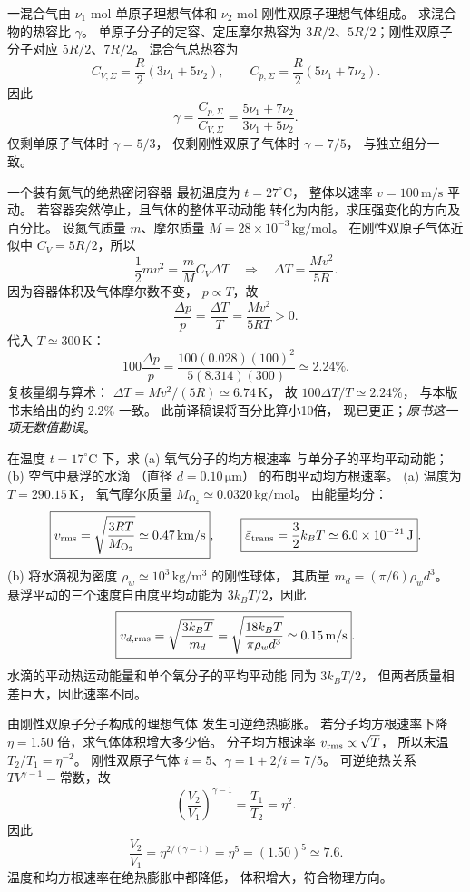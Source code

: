 一混合气由 $\nu_1$ mol 单原子理想气体和
$\nu_2$ mol 刚性双原子理想气体组成。
求混合物的热容比 $\gamma$。
\exsolution
单原子分子的定容、定压摩尔热容为
$3R/2$、$5R/2$；刚性双原子分子对应
$5R/2$、$7R/2$。
混合气总热容为
\[
C_{V,\Sigma}=\frac R2(3\nu_1+5\nu_2),\qquad
C_{p,\Sigma}=\frac R2(5\nu_1+7\nu_2).
\]
因此
\[
\boxed{\gamma=
\frac{C_{p,\Sigma}}{C_{V,\Sigma}}
=\frac{5\nu_1+7\nu_2}{3\nu_1+5\nu_2}}.
\]
\excheck 仅剩单原子气体时 $\gamma=5/3$，
仅剩刚性双原子气体时 $\gamma=7/5$，
与独立组分一致。

一个装有氮气的绝热密闭容器
最初温度为 $t=27^\circ\mathrm C$，
整体以速率 $v=100\,\mathrm{m/s}$ 平动。
若容器突然停止，且气体的整体平动动能
转化为内能，求压强变化的方向及百分比。
\exsolution
设氮气质量 $m$、摩尔质量
$M=28\times10^{-3}\,\mathrm{kg/mol}$。
在刚性双原子气体近似中
$C_V=5R/2$，所以
\[
\frac12mv^2=\frac mM C_V\Delta T
\quad\Longrightarrow\quad
\Delta T=\frac{Mv^2}{5R}.
\]
因为容器体积及气体摩尔数不变，
$p\propto T$，故
\[
\boxed{\frac{\Delta p}{p}
=\frac{\Delta T}{T}
=\frac{Mv^2}{5RT}>0}.
\]
代入 $T\simeq300\,\mathrm K$：
\[
\boxed{100\frac{\Delta p}{p}
=\frac{100(0.028)(100)^2}{5(8.314)(300)}
\simeq2.24\%}.
\]
\excheck 复核量纲与算术：
$\Delta T=Mv^2/(5R)\simeq6.74\,\mathrm K$，
故 $100\Delta T/T\simeq2.24\%$，
与本版书末给出的约 $2.2\%$ 一致。
此前译稿误将百分比算小10倍，
现已更正；\emph{原书这一项无数值勘误}。

在温度 $t=17^\circ\mathrm C$ 下，求
(a) 氧气分子的均方根速率
与单分子的平均平动动能；
(b) 空气中悬浮的水滴
（直径 $d=0.10\,\mathrm{\mu m}$）
的布朗平动均方根速率。
\exsolution
(a) 温度为 $T=290.15\,\mathrm K$，
氧气摩尔质量
$M_{\mathrm O_2}\simeq0.0320\,\mathrm{kg/mol}$。
由能量均分：
\[
\boxed{v_{\rm rms}=\sqrt{\frac{3RT}{M_{\mathrm O_2}}}
\simeq0.47\,\mathrm{km/s}},\qquad
\boxed{\bar\varepsilon_{\rm trans}=\frac32k_BT
\simeq6.0\times10^{-21}\,\mathrm J}.
\]
(b) 将水滴视为密度
$\rho_w\simeq10^3\,\mathrm{kg/m^3}$
的刚性球体，
其质量
$m_d=(\pi/6)\rho_wd^3$。
悬浮平动的三个速度自由度平均动能为
$3k_BT/2$，因此
\[
\boxed{v_{d,\rm rms}=
\sqrt{\frac{3k_BT}{m_d}}
=\sqrt{\frac{18k_BT}{\pi\rho_wd^3}}
\simeq0.15\,\mathrm{m/s}}.
\]
\excheck 水滴的平动热运动能量和单个氧分子的平均平动能
同为 $3k_BT/2$，
但两者质量相差巨大，因此速率不同。

由刚性双原子分子构成的理想气体
发生可逆绝热膨胀。
若分子均方根速率下降
$\eta=1.50$ 倍，求气体体积增大多少倍。
\exsolution
分子均方根速率
$v_{\rm rms}\propto\sqrt T$，
所以末温
$T_2/T_1=\eta^{-2}$。
刚性双原子气体
$i=5$、$\gamma=1+2/i=7/5$。
可逆绝热关系
$TV^{\gamma-1}=\text{常数}$，故
\[
\left(\frac{V_2}{V_1}\right)^{\gamma-1}
=\frac{T_1}{T_2}=\eta^2.
\]
因此
\[
\boxed{\frac{V_2}{V_1}
=\eta^{2/(\gamma-1)}
=\eta^5
=(1.50)^5\simeq7.6}.
\]
\excheck 温度和均方根速率在绝热膨胀中都降低，
体积增大，符合物理方向。

